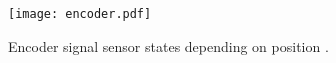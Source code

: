 \begin{figure}[H]
	\centering
	\texttt{[image: encoder.pdf]}
	\caption{Encoder signal sensor states depending on position \cite{motor_encoder}.}
	\label{fig:encoder}
\end{figure}



